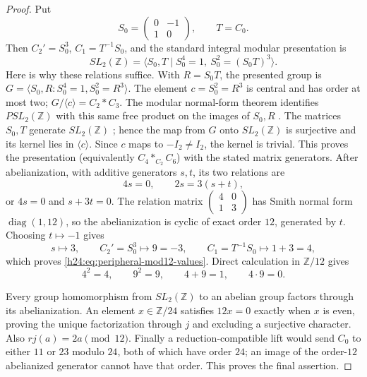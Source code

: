 \begin{proof}
Put
\[
 S_0=\begin{pmatrix}0&-1\\1&0\end{pmatrix},\qquad T=C_0.
\]
Then \(C_2'=S_0^3\), \(C_1=T^{-1}S_0\), and the standard integral modular
presentation is
\[
 SL_2(\mathbb Z)=
 \langle S_0,T\mid S_0^4=1,\ S_0^2=(S_0T)^3\rangle.
\]
Here is why these relations suffice.  With \(R=S_0T\), the presented
group is \(G=\langle S_0,R:S_0^4=1,S_0^2=R^3\rangle\).
The element \(c=S_0^2=R^3\) is central and has order at most two;
\(G/\langle c\rangle=C_2*C_3\).  The modular normal-form theorem
identifies \(PSL_2(\mathbb Z)\) with this same free product on the images of
\(S_0,R\) \cite[Theorem~C.1, pp.~18--19]{h24:ConradSL2Z}.
The matrices \(S_0,T\) generate \(SL_2(\mathbb Z)\)
\cite[Theorem~1.1, pp.~1--2]{h24:ConradSL2Z}; hence the map from \(G\)
onto \(SL_2(\mathbb Z)\) is surjective and its kernel lies in
\(\langle c\rangle\).  Since \(c\) maps to \(-I_2\ne I_2\), the
kernel is trivial.  This proves the presentation (equivalently
\(C_4*_{C_2}C_6\)) with the stated matrix generators.
After abelianization, with additive generators \(s,t\), its two relations
are
\[
 4s=0,\qquad 2s=3(s+t),
\]
or \(4s=0\) and \(s+3t=0\).  The relation matrix
\(\left(\begin{smallmatrix}4&0\\1&3\end{smallmatrix}\right)\) has Smith
normal form \(\operatorname{diag}(1,12)\), so the abelianization is cyclic of exact order
\(12\), generated by \(t\).  Choosing \(t\mapsto-1\) gives
\[
 s\mapsto3,\qquad
 C_2'=S_0^3\mapsto9=-3,\qquad
 C_1=T^{-1}S_0\mapsto1+3=4,
\]
which proves \eqref{h24:eq:peripheral-mod12-values}.  Direct calculation in
\(\mathbb Z/12\) gives
\[
 4^2=4,\qquad9^2=9,\qquad4+9=1,\qquad4\cdot9=0.
\]

Every group homomorphism from \(SL_2(\mathbb Z)\) to an abelian group factors through its
abelianization.  An element \(x\in\mathbb Z/24\) satisfies \(12x=0\) exactly when
\(x\) is even, proving the unique factorization through \(j\) and
excluding a surjective character.  Also \(rj(a)=2a\pmod {12}\).
Finally a reduction-compatible lift
would send \(C_0\) to either \(11\) or \(23\) modulo \(24\), both of which
have order \(24\); an image of the order-\(12\) abelianized generator
cannot have that order.  This proves the final assertion.
\end{proof}

